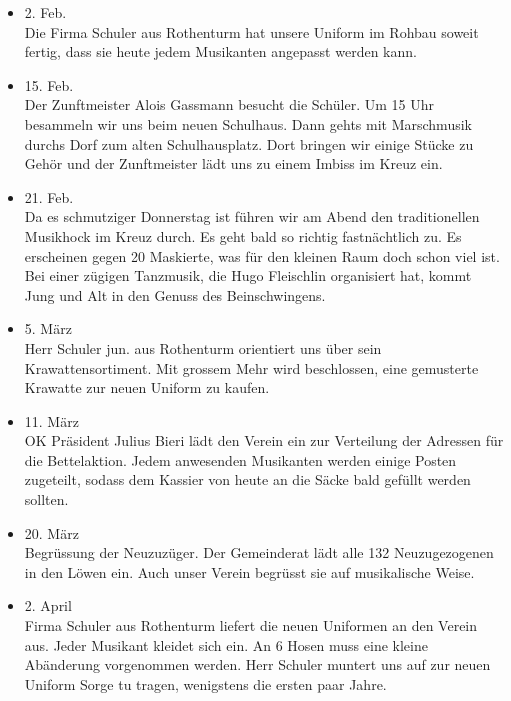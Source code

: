 \begin{multicols}{2}
\begin{itemize}
        \item[]2. Feb.\\
        Die Firma Schuler aus Rothenturm hat unsere Uniform im
        Rohbau soweit fertig, dass sie heute jedem Musikanten
        angepasst werden kann.

        \item[]15. Feb.\\
        Der Zunftmeister Alois Gassmann besucht die
        Schüler. Um 15 Uhr besammeln wir uns beim neuen
        Schulhaus. Dann gehts mit Marschmusik durchs Dorf
        zum alten Schulhausplatz. Dort bringen wir einige Stücke zu
        Gehör und der Zunftmeister lädt uns zu einem Imbiss
        im Kreuz ein.

        \item[]21. Feb.\\
        Da es schmutziger Donnerstag ist führen wir am
        Abend den traditionellen Musikhock im Kreuz durch.
        Es geht bald so richtig fastnächtlich zu. Es erscheinen gegen
        20 Maskierte, was für den kleinen Raum doch schon viel ist.
        Bei einer zügigen Tanzmusik, die Hugo Fleischlin organisiert
        hat, kommt Jung und Alt in den Genuss des Beinschwingens.

        \item[]5. März\\
        Herr Schuler jun. aus Rothenturm orientiert uns über sein
        Krawattensortiment. Mit grossem Mehr wird beschlossen,
        eine gemusterte Krawatte zur neuen Uniform zu kaufen.

        \item[]11. März\\
        OK Präsident Julius Bieri lädt den Verein ein zur Verteilung
        der Adressen für die Bettelaktion. Jedem
        anwesenden Musikanten werden einige Posten zugeteilt, sodass
        dem Kassier von heute an die Säcke bald gefüllt werden sollten.

        \item[]20. März\\
        Begrüssung der Neuzuzüger. Der Gemeinderat
        lädt alle 132 Neuzugezogenen in den Löwen ein. Auch
        unser Verein begrüsst sie auf musikalische Weise.

        \item[]2. April\\
        Firma Schuler aus Rothenturm liefert die neuen
        Uniformen an den Verein aus. Jeder Musikant
        kleidet sich ein. An 6 Hosen muss eine kleine Abänderung
        vorgenommen werden. Herr Schuler muntert uns
        auf zur neuen Uniform Sorge tu tragen, wenigstens
        die ersten paar Jahre.


\end{itemize}
\end{multicols}
